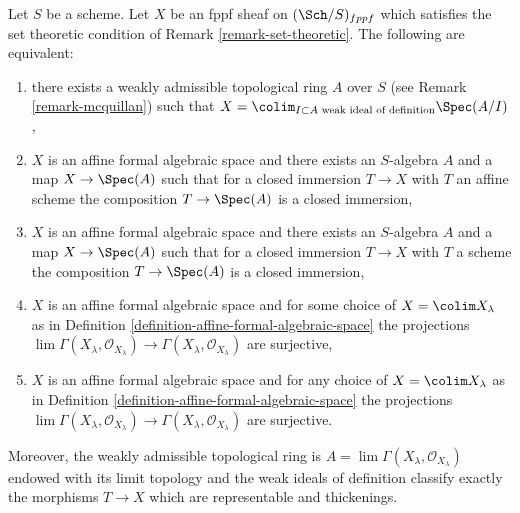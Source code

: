 \begin{lemma}
\label{lemma-mcquillan-affine-formal-algebraic-space}
Let $S$ be a scheme. Let $X$ be an fppf sheaf on $(\Sch/S)_{fppf}$
which satisfies the set theoretic condition of
Remark \ref{remark-set-theoretic}.
The following are equivalent:
\begin{enumerate}
\item there exists a weakly admissible topological ring $A$ over $S$
(see Remark \ref{remark-mcquillan}) such that
$X = \colim_{I \subset A\text{ weak ideal of definition}} \Spec(A/I)$,
\item $X$ is an affine formal algebraic space and
there exists an $S$-algebra $A$ and a map $X \to \Spec(A)$
such that for a closed immersion $T \to X$ with $T$ an affine scheme
the composition $T \to \Spec(A)$ is a closed immersion,
\item $X$ is an affine formal algebraic space and
there exists an $S$-algebra $A$ and a map $X \to \Spec(A)$
such that for a closed immersion $T \to X$ with $T$ a scheme
the composition $T \to \Spec(A)$ is a closed immersion,
\item $X$ is an affine formal algebraic space and
for some choice of $X = \colim X_\lambda$ as in
Definition \ref{definition-affine-formal-algebraic-space}
the projections $\lim \Gamma(X_\lambda, \mathcal{O}_{X_\lambda})
\to \Gamma(X_\lambda, \mathcal{O}_{X_\lambda})$ are surjective,
\item $X$ is an affine formal algebraic space and for any choice
of $X = \colim X_\lambda$ as in
Definition \ref{definition-affine-formal-algebraic-space}
the projections $\lim \Gamma(X_\lambda, \mathcal{O}_{X_\lambda})
\to \Gamma(X_\lambda, \mathcal{O}_{X_\lambda})$ are surjective.
\end{enumerate}
Moreover, the weakly admissible topological ring is
$A = \lim \Gamma(X_\lambda, \mathcal{O}_{X_\lambda})$
endowed with its limit topology and the weak ideals of definition
classify exactly the morphisms $T \to X$ which are representable
and thickenings.
\end{lemma}

